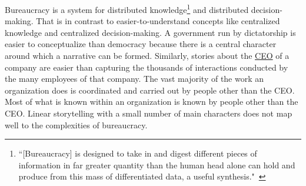 Bureaucracy is a system for distributed knowledge\footnote{``[Bureaucracy] is designed to take in and digest different pieces of information in far greater quantity than the human head alone can hold and produce from this mass of differentiated data, a useful synthesis."~\cite{1966_Morison}} 
and distributed decision-making. 
That is in contrast to easier-to-understand concepts like centralized knowledge and centralized decision-making. A government run by dictatorship is easier to conceptualize than democracy because there is a central character around which a narrative can be formed. Similarly, stories about the \href{https://en.wikipedia.org/wiki/Chief_executive_officer}{CEO} 
%
\iftoggle{WPinmargin}{\marginpar{$>$Wikipedia: Chief executive officer}}{}
of a company are easier than capturing the thousands of interactions conducted by the many employees of that company. The vast majority of the work an organization does is coordinated and carried out by people other than the CEO. Most of what is known within an organization is known by people other than the CEO. Linear storytelling with a small number of main characters does not map well to the complexities of bureaucracy. 


